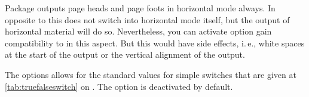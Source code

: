 \begin{Declaration}
\end{Declaration}
%
Package  outputs page heads and page foots in horizontal
mode always. In opposite to this  does not switch
into horizontal mode itself, but the output of horizontal material will do
so. Nevertheless, you can activate option  gain compatibility to
 in this
aspect. But this would have side effects, i.\,e., white
spaces at the start of the output or the vertical alignment of the output.

The options allows for the standard values for simple switches that are given
at \autoref{tab:truefalseswitch} on . The
option is deactivated by default.%
%
%
%

